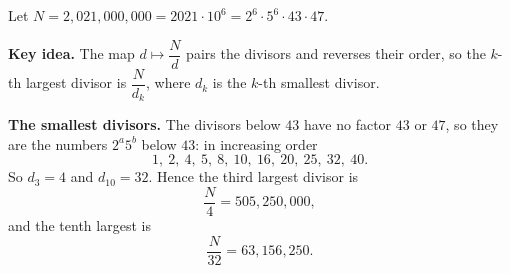 Let $N=2{,}021{,}000{,}000=2021\cdot10^6=2^6\cdot5^6\cdot43\cdot47$.

\textbf{Key idea.} The map $d\mapsto\dfrac Nd$ pairs the divisors and reverses their order, so the $k$-th largest divisor is $\dfrac{N}{d_k}$, where $d_k$ is the $k$-th smallest divisor.

\textbf{The smallest divisors.} The divisors below $43$ have no factor $43$ or $47$, so they are the numbers $2^a5^b$ below $43$: in increasing order
\[1,\ 2,\ 4,\ 5,\ 8,\ 10,\ 16,\ 20,\ 25,\ 32,\ 40.\]
So $d_3=4$ and $d_{10}=32$. Hence the third largest divisor is
\[\dfrac{N}{4}=\boxed{505{,}250{,}000},\]
and the tenth largest is
\[\dfrac{N}{32}=\boxed{63{,}156{,}250}.\]
